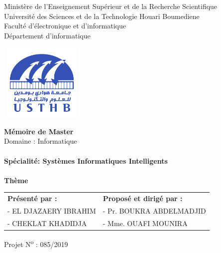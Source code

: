 \documentclass[12pt , a4paper]{report}
\begin{document}
\begin{center}
\normalsize{Ministère de l'Enseignement Supérieur et de la Recherche Scientifique}\\
\normalsize{Université des Sciences et de la Technologie Houari Boumediene}\\
\normalsize{Faculté d'électronique et d'informatique}\\
\normalsize{Département d'informatique}\\
\end{center}
\begin{center}
\includegraphics[width=4cm,height=3.7cm]{usthb.png}
\end{center}


\begin{center}
\Huge{\textbf{Mémoire de Master}}\\
\large{Domaine : Informatique}\\
\textbf{}\\
\large{\textbf{Spécialité: Systèmes Informatiques Intelligents}}\\
\textbf{}\\
\bigskip
\vspace*{1cm}
\normalsize{\textbf{Thème}}
\end{center}
\vspace*{1.5cm}

\begin{table}[h]
\center
\begin{tabular}{p{8cm}p{6.5cm}}
\textbf{Présenté par :} & \textbf{Proposé et dirigé par :}\\
- EL DJAZAERY IBRAHIM  & -	Pr. BOUKRA ABDELMADJID\\
- CHEKLAT KHADIDJA  & - Mme. OUAFI MOUNIRA\\
\end{tabular}
\end{table}

\vspace*{0.5cm}

\begin{center}
Projet N\textsuperscript{o} : 085/2019
\end{center}
\end{document}
